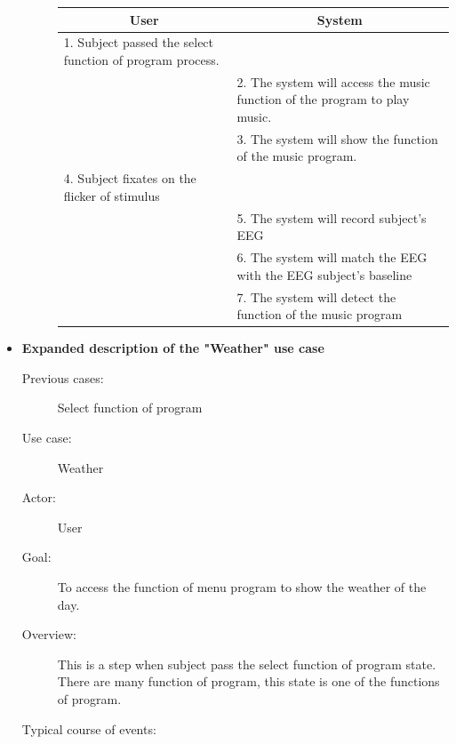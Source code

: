 \begin{itemize}
\begin{description}
	{
		\centering
		\begin{tabular}{| m{.47\linewidth} | m{.47\linewidth} |}
			
			\hline 
			\multicolumn{1}{|c}{\textbf{User}} & 
  			\multicolumn{1}{|c|}{\textbf{System}}\\
			\hline 
			1. Subject passed the select function of program process. &   \\
			\hline 
			 & 2. The system will access the music function of the program to play music.  \\
			\hline 
			& 3. The system will show the function of the music program. \\
			\hline 
			4. Subject fixates on the flicker of stimulus &  \\
			\hline
			 & 5. The system will record subject's EEG \\
			\hline
			& 6. The system will match the EEG with the EEG subject's baseline\\
			\hline
            & 7. The system will detect the function of the music program\\
			\hline
		\end{tabular}
	}
	
\end{description}

\newpage
\item \textbf{Expanded description of the "Weather" use case }
\begin{description}
	\item [Previous cases:] Select function of program
	\item [Use case:] Weather
	\item [Actor:] User  
	\item [Goal:] To access the function of menu program to show the weather of the day. 
	\item [Overview:] This is a step when subject pass the select function of program state. There are many function of program, this state is one of the functions of program. 
	\item [Typical course of events:]~
	
	{
		\centering
		\begin{tabular}{| m{.47\linewidth} | m{.47\linewidth} |}
			

\end{tabular}}
\end{description}
\end{itemize}
